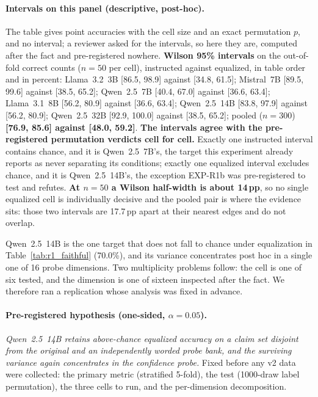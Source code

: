 \paragraph{Intervals on this panel (descriptive, post-hoc).} The table gives point accuracies with the cell size and an exact permutation $p$, and no interval; a reviewer asked for the intervals, so here they are, computed after the fact and pre-registered nowhere. \textbf{Wilson 95\% intervals} on the out-of-fold correct counts ($n\!=\!50$ per cell), instructed against equalized, in table order and in percent: Llama~3.2~3B [86.5, 98.9] against [34.8, 61.5]; Mistral~7B [89.5, 99.6] against [38.5, 65.2]; Qwen~2.5~7B [40.4, 67.0] against [36.6, 63.4]; Llama~3.1~8B [56.2, 80.9] against [36.6, 63.4]; Qwen~2.5~14B [83.8, 97.9] against [56.2, 80.9]; Qwen~2.5~32B [92.9, 100.0] against [38.5, 65.2]; pooled ($n\!=\!300$) \textbf{[76.9, 85.6] against [48.0, 59.2]}. \textbf{The intervals agree with the pre-registered permutation verdicts cell for cell.} Exactly one instructed interval contains chance, and it is Qwen~2.5~7B's, the target this experiment already reports as never separating its conditions; exactly one equalized interval excludes chance, and it is Qwen~2.5~14B's, the exception EXP-R1b was pre-registered to test and refutes. \textbf{At $n\!=\!50$ a Wilson half-width is about 14\,pp}, so no single equalized cell is individually decisive and the pooled pair is where the evidence sits: those two intervals are 17.7\,pp apart at their nearest edges and do not overlap.

Qwen~2.5~14B is the one target that does not fall to chance under equalization in Table~\ref{tab:r1_faithful} (70.0\%), and its variance concentrates post hoc in a single one of 16 probe dimensions. Two multiplicity problems follow: the cell is one of six tested, and the dimension is one of sixteen inspected after the fact. We therefore ran a replication whose analysis was fixed in advance.

\paragraph{Pre-registered hypothesis (one-sided, $\alpha=0.05$).} \emph{Qwen~2.5~14B retains above-chance equalized accuracy on a claim set disjoint from the original and an independently worded probe bank, and the surviving variance again concentrates in the confidence probe.} Fixed before any v2 data were collected: the primary metric (stratified 5-fold), the test (1000-draw label permutation), the three cells to run, and the per-dimension decomposition.

